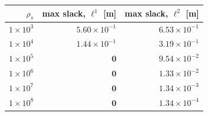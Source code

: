 \begin{tabular}{rrr}
  \toprule
  $\rho_s$ & max slack, $\ell^1$ [m] & max slack, $\ell^2$ [m] \\
  \midrule
  $1\times 10^{3}$ & $5.60\times 10^{-1}$ & $6.53\times 10^{-1}$ \\
  $1\times 10^{4}$ & $1.44\times 10^{-1}$ & $3.19\times 10^{-1}$ \\
  $1\times 10^{5}$ & $\mathbf{0}$ & $9.54\times 10^{-2}$ \\
  $1\times 10^{6}$ & $\mathbf{0}$ & $1.33\times 10^{-2}$ \\
  $1\times 10^{7}$ & $\mathbf{0}$ & $1.34\times 10^{-3}$ \\
  $1\times 10^{8}$ & $\mathbf{0}$ & $1.34\times 10^{-4}$ \\
  \bottomrule
\end{tabular}
